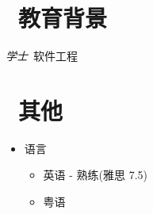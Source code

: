 \documentclass{resume}
\begin{document}
\section{\faGraduationCap\  教育背景}
\textit{学士}\ 软件工程

\section{\faInfo\ 其他}
\begin{itemize}[parsep=0.5ex]
  \item 语言
  \begin{itemize}
    \item 英语 - 熟练(雅思 7.5)
  \end{itemize}
  \begin{itemize}
    \item 粤语
  \end{itemize}
\end{itemize}

%
%
\end{document}
